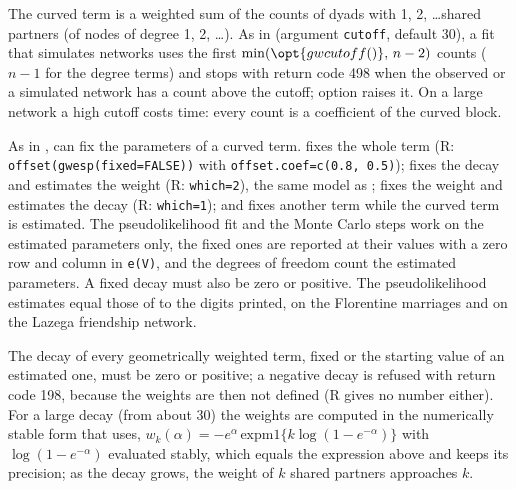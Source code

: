 The curved term is a weighted sum of the counts of dyads with 1, 2, \ldots shared partners (of nodes of degree 1, 2, \ldots). As in \ergm{} (argument \texttt{cutoff}, default 30), a fit that simulates networks uses the first $\min(\opt{gwcutoff()},\,n-2)$ counts ($n-1$ for the degree terms) and stops with return code 498 when the observed or a simulated network has a count above the cutoff; option  raises it. On a large network a high cutoff costs time: every count is a coefficient of the curved block.

As in \ergm{},  can fix the parameters of a curved term.  fixes the whole term (R: \texttt{offset(gwesp(fixed=FALSE))} with \texttt{offset.coef=c(0.8, 0.5)});  fixes the decay and estimates the weight (R: \texttt{which=2}), the same model as ;  fixes the weight and estimates the decay (R: \texttt{which=1}); and  fixes another term while the curved term is estimated. The pseudolikelihood fit and the Monte Carlo steps work on the estimated parameters only, the fixed ones are reported at their values with a zero row and column in \texttt{e(V)}, and the degrees of freedom count the estimated parameters. A fixed decay must also be zero or positive. The pseudolikelihood estimates equal those of \ergm{} to the digits printed, on the Florentine marriages and on the Lazega friendship network.

The decay of every geometrically weighted term, fixed or the starting value of an estimated one, must be zero or positive; a negative decay is refused with return code 198, because the weights are then not defined (R gives no number either). For a large decay (from about 30) the weights are computed in the numerically stable form that \ergm{} uses, $w_k(\alpha)=-e^{\alpha}\,\mathrm{expm1}\{k\log(1-e^{-\alpha})\}$ with $\log(1-e^{-\alpha})$ evaluated stably, which equals the expression above and keeps its precision; as the decay grows, the weight of $k$ shared partners approaches $k$.
